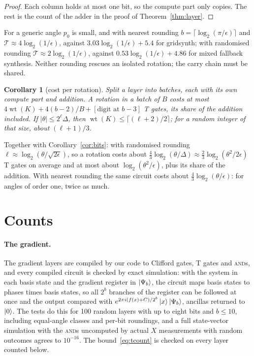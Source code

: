\documentclass[aps,prx,twocolumn,superscriptaddress,nofootinbib,longbibliography]{revtex4-2}
\newtheorem{corollary}[theorem]{Corollary}
\theoremstyle{remark}
\newcommand{\AND}{\textup{\textsc{and}}}
\newcommand{\wt}{\operatorname{wt}}
\newcommand{\Tc}{\mathcal{T}}
\begin{document}
\begin{proof}
Each column holds at most one bit, so the compute part only copies. The rest is the count of
the adder in the proof of Theorem~\ref{thm:layer}.
\end{proof}

For a generic angle $p_0$ is small, and with nearest rounding $b=\lceil\log_2(\pi/\epsilon)
\rceil$ and $\Tc\approx4\log_2(1/\epsilon)$, against $3.03\log_2(1/\epsilon)+5.4$ for gridsynth;
with randomised rounding $\Tc\approx2\log_2(1/\epsilon)$, against
$0.53\log_2(1/\epsilon)+4.86$ for mixed fallback synthesis. Neither rounding rescues an isolated
rotation; the carry chain must be shared.

\begin{corollary}[cost per rotation]\label{cor:per}
Split a layer into batches, each with its own compute part and addition. A rotation in a batch
of $B$ costs at most $4\wt(K)+4(b-2)/B+[\text{digit at }b-3]$ T gates, its share of the addition
included. If $|\theta|\le2^\ell\Delta$, then $\wt(K)\le\lceil(\ell+2)/2\rceil$; for a random
integer of that size, about $(\ell+1)/3$.
\end{corollary}

Together with Corollary~\ref{cor:bits}: with randomised rounding $\ell\approx\log_2(\theta/
\sqrt{2\epsilon})$, so a rotation costs about $\tfrac43\log_2(\theta/\Delta)\approx
\tfrac23\log_2(\theta^2/2\epsilon)$ T gates on average and at most about $\log_2(\theta^2/
\epsilon)$, plus its share of the addition. With nearest rounding the same circuit costs about
$\tfrac43\log_2(\theta/\epsilon)$: for angles of order one, twice as much.

\section{Counts}\label{sec:numbers}
\paragraph*{The gradient.}
The gradient layers are compiled by our code to Clifford gates, T gates and \AND{}s, and every
compiled circuit is checked by exact simulation: with the system in each basis state and the
gradient register in $\ket{\Psi_b}$, the circuit maps basis states to phases times basis states,
so all $2^b$ branches of the register can be followed at once and the output compared with
$e^{2\pi i(f(x)+C)/2^b}\ket{x}\ket{\Psi_b}$, ancillas returned to $\ket0$. The tests do this
for 100 random layers with up to eight bits and $b\le10$, including equal-angle classes and
per-bit roundings, and a full state-vector simulation with the \AND{}s uncomputed by actual $X$
measurements with random outcomes agrees to $10^{-16}$. The bound~\eqref{eq:tcount} is checked
on every layer counted below.
\end{document}
